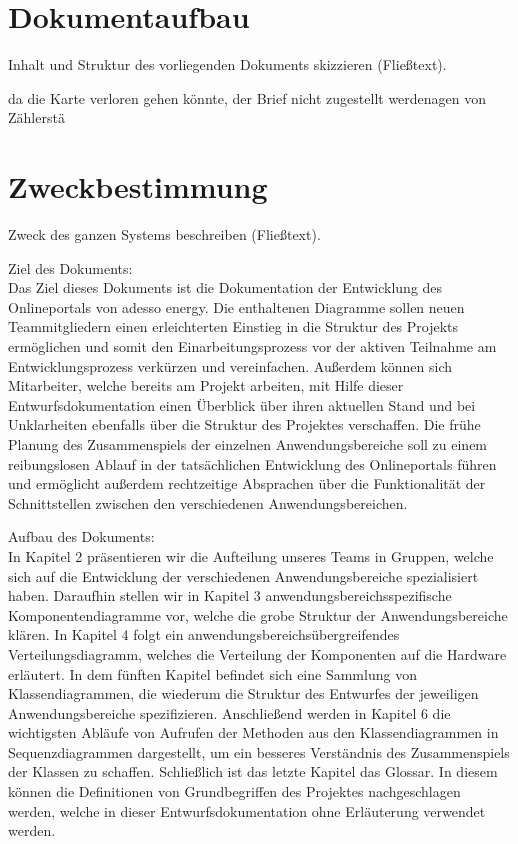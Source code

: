 \section{Dokumentaufbau}\label{sec:dokumentaufbau}
\begin{tcolorbox}
	Inhalt und Struktur des vorliegenden Dokuments skizzieren (Fließtext).
\end{tcolorbox}

da die Karte verloren gehen könnte, der Brief nicht zugestellt werdenagen von Zählerstä 


\section{Zweckbestimmung}\label{sec:zweckbestimmung}
\begin{tcolorbox}
	Zweck des ganzen Systems beschreiben (Fließtext).
\end{tcolorbox}

Ziel des Dokuments: \\
Das Ziel dieses Dokuments ist die Dokumentation der Entwicklung des Onlineportals von adesso energy. 
Die enthaltenen Diagramme sollen neuen Teammitgliedern einen erleichterten Einstieg in die Struktur des Projekts ermöglichen 
und somit den Einarbeitungsprozess vor der aktiven Teilnahme am Entwicklungsprozess verkürzen und vereinfachen.  
Außerdem können sich Mitarbeiter, welche bereits am Projekt arbeiten, mit Hilfe dieser Entwurfsdokumentation einen Überblick über 
ihren aktuellen Stand und bei Unklarheiten ebenfalls über die Struktur des Projektes verschaffen.
Die frühe Planung des Zusammenspiels der einzelnen Anwendungsbereiche soll zu einem reibungslosen Ablauf 
in der tatsächlichen Entwicklung des Onlineportals führen und ermöglicht außerdem rechtzeitige Absprachen über die Funktionalität 
der Schnittstellen zwischen den verschiedenen Anwendungsbereichen.

\newpage

Aufbau des Dokuments: \\
In Kapitel 2 präsentieren wir die Aufteilung unseres Teams in Gruppen, welche sich auf die Entwicklung 
der verschiedenen Anwendungsbereiche spezialisiert haben. Daraufhin stellen wir in Kapitel 3 anwendungsbereichsspezifische 
Komponentendiagramme vor, welche die grobe Struktur der Anwendungsbereiche klären.
In Kapitel 4 folgt ein anwendungsbereichsübergreifendes Verteilungsdiagramm, welches die Verteilung der Komponenten auf die Hardware erläutert. 
In dem fünften Kapitel befindet sich eine Sammlung von Klassendiagrammen, die wiederum die Struktur des Entwurfes 
der jeweiligen Anwendungsbereiche spezifizieren. Anschließend werden in Kapitel 6 die wichtigsten Abläufe von Aufrufen 
der Methoden aus den Klassendiagrammen in Sequenzdiagrammen dargestellt, um ein besseres Verständnis 
des Zusammenspiels der Klassen zu schaffen. Schließlich ist das letzte Kapitel das Glossar. 
In diesem können die Definitionen von Grundbegriffen des Projektes nachgeschlagen werden, welche in 
dieser Entwurfsdokumentation ohne Erläuterung verwendet werden.
\\

